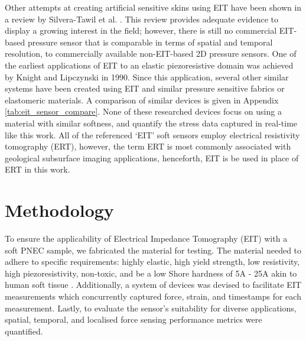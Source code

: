 Other attempts at creating artificial sensitive skins using EIT have been shown in a review by Silvera-Tawil et al. \cite{Silvera-Tawil2015}. This review provides adequate evidence to display a growing interest in the field; however, there is still no commercial EIT-based pressure sensor that is comparable in terms of spatial and temporal resolution, to commercially available non-EIT-based 2D pressure sensors.
One of the earliest applications of EIT to an elastic piezoresistive domain was achieved by Knight and Lipczynski \cite{Knight1990} in 1990. Since this application, several other similar systems have been created using EIT and similar pressure sensitive fabrics or elastomeric materials\cite{Nagakubo2007,Russo2017,Sun2020,Silvera-Tawil2015,Yoon2017,Kato2007,Biasi2022}. A comparison of similar devices is given in Appendix \ref{tab:eit_sensor_compare}. None of these researched devices focus on using a material with similar softness, and quantify the stress data captured in real-time like this work. All of the referenced `EIT' soft sensors employ electrical resistivity tomography (ERT), however, the term ERT is most commonly associated with geological subsurface imaging applications, henceforth, EIT is be used in place of ERT in this work.



\section{Methodology} \label{sec:Methodology}
To ensure the applicability of Electrical Impedance Tomography (EIT) with a soft PNEC sample, we fabricated the material for testing. The material needed to adhere to specific requirements: highly elastic,  high yield strength, low resistivity, high piezoresistivity, non-toxic, and be a low Shore hardness of 5A - 25A akin to human soft tissue \citep{Silvera-Tawil2015,Chatzistergos2022,McDermott2017,Landry2021}. Additionally, a system of devices was devised to facilitate EIT measurements which concurrently captured force, strain, and timestamps for each measurement. Lastly, to evaluate the sensor's suitability for diverse applications, spatial, temporal, and localised force sensing performance metrics were quantified.


